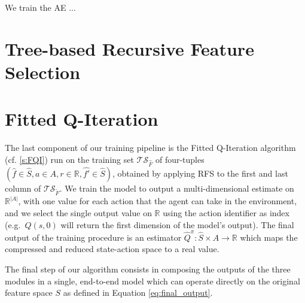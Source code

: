 We train the AE ...

\section{Tree-based Recursive Feature Selection}

\section{Fitted Q-Iteration}
The last component of our training pipeline is the Fitted Q-Iteration algorithm 
(cf. \ref{s:FQI}) run on the training set $\mathcal{TS}_{\hat{F}}$ of 
four-tuples $(\hat{f} \in \hat{S}, a \in A, r \in \mathbb{R}, \hat{f'} \in \hat{S})$, 
obtained by applying RFS to the first and last column of 
$\mathcal{TS}_{\tilde{F}}$. 
We train the model to output a multi-dimensional estimate on $\mathbb{R}^{|A|}$,
with one value for each action that the agent can take in the environment, and 
we select the single output value on $\mathbb{R}$ using the action identifier as
index (e.g.\ $Q(s, 0)$ will return the first dimension of the model's output). 
The final output of the training procedure is an estimator 
$\hat{Q}^\pi: \hat{S} \times A \rightarrow \mathbb{R}$ which maps the compressed
and reduced state-action space to a real value. 

 
The final step of our algorithm consists in composing the outputs of the three 
modules in a single, end-to-end model which can operate directly on the original
feature space $S$ as defined in Equation \eqref{eq:final_output}.
